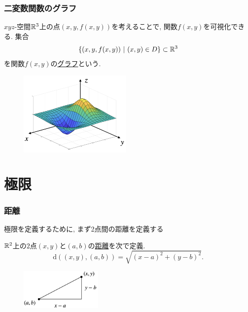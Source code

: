 \begin{frame}
\frametitle{二変数関数のグラフ}


$xyz$-空間$\mathbb{R}^3$上の点$(x,y,f(x,y))$を考えることで, 関数$f(x,y)$を可視化できる. 
集合
$$
\{(x,y,f(x,y)) \ | \ (x, y) \in D\} \subset \mathbb{R}^3
$$
を関数$f(x,y)$の\underline{グラフ}という. 

\vspace{-3mm}

\begin{figure}[htbp]
 \begin{center} 
  \includegraphics[width=55mm]{calculus10/graph3d.png}
 \end{center}
\end{figure}

\vspace{-3mm}

\end{frame}





\section{極限}


\begin{frame}
\frametitle{距離}

極限を定義するために, まず2点間の距離を定義する

\begin{Def}
$\mathbb{R}^2$上の$2$点$(x,y)$と$(a,b)$の\underline{距離}を次で定義. 
$$
\mathrm{d}((x,y),(a,b))=\sqrt{(x-a)^2+(y-b)^2}. 
$$
\end{Def}

\vspace{-2mm}

\begin{figure}[htbp]
 \begin{center} 
  \includegraphics[width=40mm]{calculus10/dist.png}
 \end{center}
\end{figure}

\vspace{-2mm}

\end{frame}


